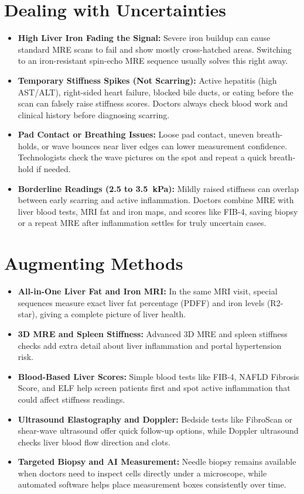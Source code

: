 \section{Dealing with Uncertainties}
\begin{itemize}
\item \textbf{High Liver Iron Fading the Signal:} Severe iron buildup can cause standard MRE scans to fail and show mostly cross-hatched areas. Switching to an iron-resistant spin-echo MRE sequence usually solves this right away.
\item \textbf{Temporary Stiffness Spikes (Not Scarring):} Active hepatitis (high AST/ALT), right-sided heart failure, blocked bile ducts, or eating before the scan can falsely raise stiffness scores. Doctors always check blood work and clinical history before diagnosing scarring.
\item \textbf{Pad Contact or Breathing Issues:} Loose pad contact, uneven breath-holds, or wave bounces near liver edges can lower measurement confidence. Technologists check the wave pictures on the spot and repeat a quick breath-hold if needed.
\item \textbf{Borderline Readings (2.5 to 3.5~kPa):} Mildly raised stiffness can overlap between early scarring and active inflammation. Doctors combine MRE with liver blood tests, MRI fat and iron maps, and scores like FIB-4, saving biopsy or a repeat MRE after inflammation settles for truly uncertain cases.
\end{itemize}

\section{Augmenting Methods}
\begin{itemize}
\item \textbf{All-in-One Liver Fat and Iron MRI:} In the same MRI visit, special sequences measure exact liver fat percentage (PDFF) and iron levels (R2-star), giving a complete picture of liver health.
\item \textbf{3D MRE and Spleen Stiffness:} Advanced 3D MRE and spleen stiffness checks add extra detail about liver inflammation and portal hypertension risk.
\item \textbf{Blood-Based Liver Scores:} Simple blood tests like FIB-4, NAFLD Fibrosis Score, and ELF help screen patients first and spot active inflammation that could affect stiffness readings.
\item \textbf{Ultrasound Elastography and Doppler:} Bedside tests like FibroScan or shear-wave ultrasound offer quick follow-up options, while Doppler ultrasound checks liver blood flow direction and clots.
\item \textbf{Targeted Biopsy and AI Measurement:} Needle biopsy remains available when doctors need to inspect cells directly under a microscope, while automated software helps place measurement boxes consistently over time.
\end{itemize}

